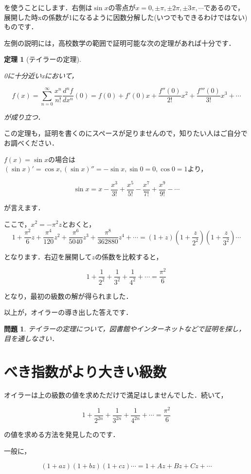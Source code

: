 \documentclass[./main]{subfiles}
\theoremstyle{break}
\newtheorem*{thm}{定理}
\newtheorem*{prb}{問題}
\begin{document}
を使うことにします．右側は$\sin x$の零点が$x=0,\pm \pi,\pm 2\pi,\pm 3\pi,\cdots$であるので，展開した時xの係数が1になるように因数分解した(いつでもできるわけではない)ものです．

左側の説明には，高校数学の範囲で証明可能な次の定理があれば十分です．

\begin{thm}[テイラーの定理]
　

0に十分近いxにおいて，

\[f(x)=\sum_{n=0}^\infty \frac{x^n}{n!}\frac{d^nf}{dx^n}(0)=f(0)+f'(0)x+\frac{f''(0)}{2!}x^2+\frac{f'''(0)}{3!}x^3+\cdots\]

が成り立つ．
\end{thm}
この定理も，証明を書くのにスペースが足りませんので，知りたい人はご自分でお調べください．

$f(x)=\sin x$の場合は$(\sin x)'=\cos x,(\sin x)''=-\sin x,\sin 0=0,\cos 0=1$より，

\[\sin x=x-\frac{x^3}{3!}+\frac{x^5}{5!}-\frac{x^7}{7!}+\frac{x^9}{9!}-\cdots\]

が言えます．

ここで，$x^2=-\pi^2 z$とおくと，
\[1+\frac{\pi^2}{6}z+\frac{\pi^4}{120}z^2+\frac{\pi^6}{5040}z^3+\frac{\pi^8}{362880}z^4+\cdots=\left(  1+z\right)\left(  1+\frac{z}{2^2}\right)\left(  1+\frac{z}{3^2}\right)\cdots\]

となります．右辺を展開して$z$の係数を比較すると，

\[1+\frac{1}{2^2}+\frac{1}{3^2}+\frac{1}{4^2}+\cdots=\frac{\pi^2}{6}\]

となり，最初の級数の解が得られました．

以上が，オイラーの導き出した答えです．

\begin{prb}
テイラーの定理について，図書館やインターネットなどで証明を探し，目を通しなさい．
\end{prb}

\section{べき指数がより大きい級数}
オイラーは上の級数の値を求めただけで満足はしませんでした．続いて，

\[1+\frac{1}{2^{2n}}+\frac{1}{3^{2n}}+\frac{1}{4^{2n}}+\cdots=\frac{\pi^2}{6}\]

の値を求める方法を発見したのです．

一般に，

\[(1+az)(1+bz)(1+cz)\cdots=1+Az+Bz+Cz+\cdots\]
\end{document}
